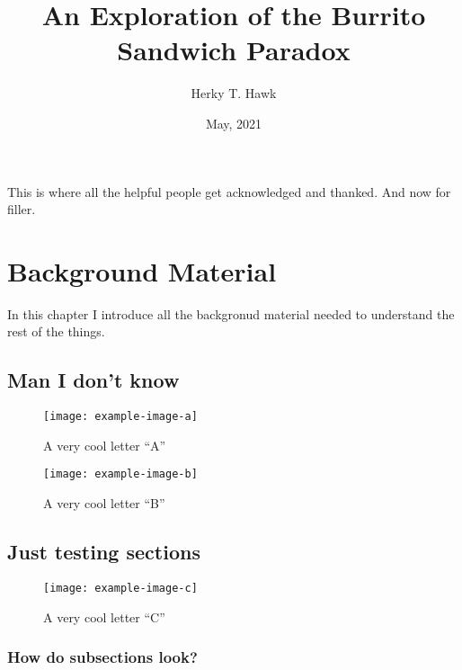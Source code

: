 \documentclass[letterpaper, openany, 12pt, oneside]{uithesis}
\title{An Exploration of the Burrito Sandwich Paradox}
\author{Herky T. Hawk}
\date{May, 2021}
\begin{document}
\titlepage

\copyrightPage

\frontmatter

\acknowledgments
This is where all the helpful people get acknowledged and thanked. And now for filler.

\lipsum[1]

\begin{publicAbstract}
	\lipsum[1-2]
\end{publicAbstract}

\begin{abstract}
	\lipsum[1-2]
\end{abstract}

\tableofcontents*

\listoffigures

\listoftables

\mainmatter

\chapter{Background Material}

In this chapter I introduce all the backgronud material needed to understand the
rest of the things.

\section{Man I don't know}
\begin{figure}
	\centering
	\label{fig:one}
	\caption{A very cool letter ``A''}
	\texttt{[image: example-image-a]}
\end{figure}
\lipsum[1-5]
\begin{figure}
	\centering
	\label{fig:two}
	\caption{A very cool letter ``B''}
	\texttt{[image: example-image-b]}
\end{figure}
\lipsum[6-10]

\section{Just testing sections}
\begin{figure}[!htb]
	\centering
	\label{fig:three}
	\caption{A very cool letter ``C''}
	\texttt{[image: example-image-c]}
\end{figure}
\lipsum[11-15]

\subsection{How do subsections look?}
\lipsum[75]
\end{document}
